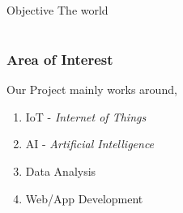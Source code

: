 \documentclass{beamer}
\begin{document}
\section[Literature Survey]{ }
\begin{frame}{Objective}
\justifying \small 
\hskip6cm The world 
\end{frame}
\section[System Design]{ }

\begin{frame}  
\frametitle{Area of Interest} 
Our Project mainly works around,
\begin{enumerate} 
	\item<1-| alert@1> IoT - \textit{Internet of Things}
	\item<2-| alert@2> AI  - \textit{Artificial Intelligence}
	\item<3-| alert@3> Data Analysis
	\item<4-| alert@4> Web/App Development  
\end{enumerate}
\end{frame}
\end{document}
